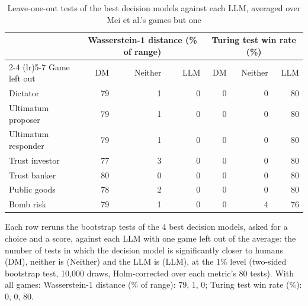 \begin{table}[htbp]
\centering
\caption{Leave-one-out tests of the best decision models against each LLM, averaged over Mei et al.'s games but one}
\label{tab:mei_leave_one_out}
\begin{tabular}{lrrrrrr}
\toprule
 & \multicolumn{3}{c}{Wasserstein-1 distance (\% of range)} & \multicolumn{3}{c}{Turing test win rate (\%)} \\
\cmidrule(lr){2-4} \cmidrule(lr){5-7}
Game left out & DM & Neither & LLM & DM & Neither & LLM \\
\midrule
Dictator & 79 & 1 & 0 & 0 & 0 & 80 \\
Ultimatum proposer & 79 & 1 & 0 & 0 & 0 & 80 \\
Ultimatum responder & 79 & 1 & 0 & 0 & 0 & 80 \\
Trust investor & 77 & 3 & 0 & 0 & 0 & 80 \\
Trust banker & 80 & 0 & 0 & 0 & 0 & 80 \\
Public goods & 78 & 2 & 0 & 0 & 0 & 80 \\
Bomb risk & 79 & 1 & 0 & 0 & 4 & 76 \\
\bottomrule
\end{tabular}
\par\smallskip
\parbox{\linewidth}{\footnotesize Each row reruns the bootstrap tests of the 4 best decision models, asked for a choice and a score, against each LLM with one game left out of the average: the number of tests in which the decision model is significantly closer to humans (DM), neither is (Neither) and the LLM is (LLM), at the 1\% level (two-sided bootstrap test, 10,000 draws, Holm-corrected over each metric's 80 tests). With all games: Wasserstein-1 distance (\% of range): 79, 1, 0; Turing test win rate (\%): 0, 0, 80.}
\end{table}

